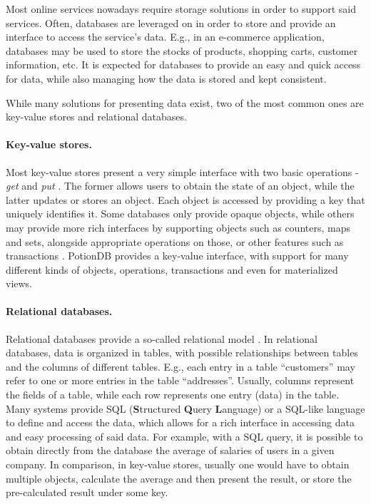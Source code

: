 Most online services nowadays require storage solutions in order to support said services.
Often, databases are leveraged on in order to store and provide an interface to access the service's data.
E.g., in an e-commerce application, databases may be used to store the stocks of products, shopping carts, customer information, etc.
It is expected for databases to provide an easy and quick access for data, while also managing how the data is stored and kept consistent.

While many solutions for presenting data exist, two of the most common ones are key-value stores and relational databases.

\paragraph{Key-value stores.}
Most key-value stores present a very simple interface with two basic operations - \emph{get} and \emph{put} \cite{dynamo, cops, cure, walter, pequod}.	%
The former allows users to obtain the state of an object, while the latter updates or stores an object.
Each object is accessed by providing a key that uniquely identifies it.
Some databases only provide opaque objects, while others may provide more rich interfaces by supporting objects such as counters, maps and sets, alongside appropriate operations on those, or other features such as transactions \cite{cure, walter, pequod}.	%
PotionDB provides a key-value interface, with support for many different kinds of objects, operations, transactions and even for materialized views.

\paragraph{Relational databases.}
Relational databases provide a so-called relational model \cite{spanner, eiger, noria}. %
In relational databases, data is organized in tables, with possible relationships between tables and the columns of different tables.
E.g., each entry in a table ``customers'' may refer to one or more entries in the table ``addresses''.
Usually, columns represent the fields of a table, while each row represents one entry (data) in the table.
Many systems provide SQL (\textbf{S}tructured \textbf{Q}uery \textbf{L}anguage) or a SQL-like language \cite{sequel, spanner, noria, mongoVScassandra} to define and access the data, which allows for a rich interface in accessing data and easy processing of said data.
For example, with a SQL query, it is possible to obtain directly from the database the average of salaries of users in a given company.
In comparison, in key-value stores, usually one would have to obtain multiple objects, calculate the average and then present the result, or store the pre-calculated result under some key.

